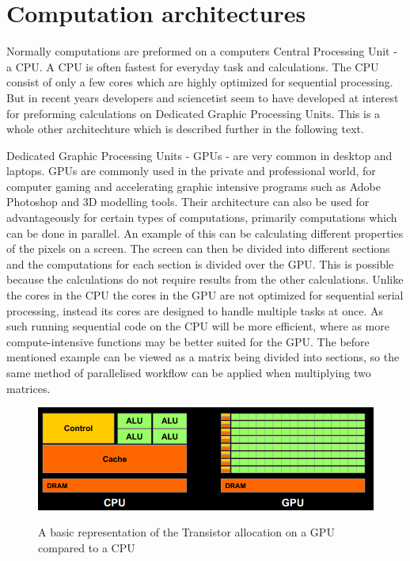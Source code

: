 \section{Computation architectures}
\label{sec:comparch}
Normally computations are preformed on a computers Central Processing Unit - a CPU.
A CPU is often fastest for everyday task and calculations.
The CPU consist of only a few cores which are highly optimized for sequential processing.\citep{whatisgpu}
But in recent years developers and sciencetist seem to have developed at interest for preforming calculations on Dedicated Graphic Processing Units.\citep{gpurise}
This is a whole other architechture which is described further in the following text.

Dedicated Graphic Processing Units - GPUs - are very common in desktop and laptops. \citep{STEAMHW}
GPUs are commonly used in the private and professional world, for computer gaming and accelerating graphic intensive programs such as Adobe Photoshop and 3D modelling tools. \citep{NVIDIAADOBE}
Their architecture can also be used for advantageously for certain types of computations, primarily computations which can be done in parallel. 
An example of this can be calculating different properties of the pixels on a screen. 
The screen can then be divided into different sections and the computations for each section is divided over the GPU.
This is possible because the calculations do not require results from the other calculations.
Unlike the cores in the CPU the cores in the GPU are not optimized for sequential serial processing, instead its cores are designed to handle multiple tasks at once. 
As such running sequential code on the CPU will be more efficient, where as more compute-intensive functions may be better suited for the GPU.\citep{NvidiaGPGPU}
The before mentioned example can be viewed as a matrix being divided into sections, so the same method of parallelised workflow can be applied when multiplying two matrices.

\begin{figure}[h!]
\centering
 \includegraphics[width=1\textwidth]{figures/GPUCPUimage.png} %
\caption{A basic representation of the Transistor allocation on a GPU compared to a CPU}\label{image:GPUCPUimage}\citep{NvidiaCUDASeminar}
\vspace{-15pt}
\end{figure}

